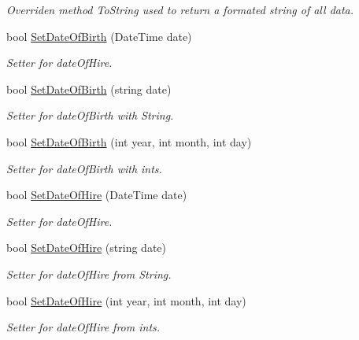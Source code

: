 \begin{DoxyCompactItemize}
\begin{DoxyCompactList}\small\item\em Overriden method To\+String used to return a formated string of all data. \end{DoxyCompactList}\item 
bool \hyperlink{class_all_employees_1_1_fulltime_employee_ae642df9b07e842857f998d539eeae502}{Set\+Date\+Of\+Birth} (Date\+Time date)
\begin{DoxyCompactList}\small\item\em Setter for date\+Of\+Hire. \end{DoxyCompactList}\item 
bool \hyperlink{class_all_employees_1_1_fulltime_employee_a8c230e078f3a9d84ccfdf2dad618edfb}{Set\+Date\+Of\+Birth} (string date)
\begin{DoxyCompactList}\small\item\em Setter for date\+Of\+Birth with String. \end{DoxyCompactList}\item 
bool \hyperlink{class_all_employees_1_1_fulltime_employee_a4198c95029b48d8da8ddf3d65574ea53}{Set\+Date\+Of\+Birth} (int year, int month, int day)
\begin{DoxyCompactList}\small\item\em Setter for date\+Of\+Birth with ints. \end{DoxyCompactList}\item 
bool \hyperlink{class_all_employees_1_1_fulltime_employee_aaf2dc1dcb158819d06958d4399850f56}{Set\+Date\+Of\+Hire} (Date\+Time date)
\begin{DoxyCompactList}\small\item\em Setter for date\+Of\+Hire. \end{DoxyCompactList}\item 
bool \hyperlink{class_all_employees_1_1_fulltime_employee_a6b7516d71f46e650da2200a308d6f226}{Set\+Date\+Of\+Hire} (string date)
\begin{DoxyCompactList}\small\item\em Setter for date\+Of\+Hire from String. \end{DoxyCompactList}\item 
bool \hyperlink{class_all_employees_1_1_fulltime_employee_ae5612c076ead69a3b6f0bbc22a21e293}{Set\+Date\+Of\+Hire} (int year, int month, int day)
\begin{DoxyCompactList}\small\item\em Setter for date\+Of\+Hire from ints. \end{DoxyCompactList}\item 

\end{DoxyCompactItemize}
